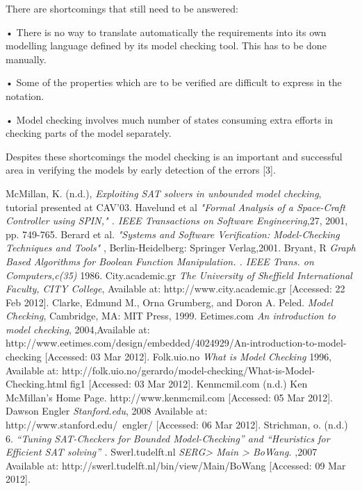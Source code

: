 \documentclass{article}
\begin{document}
There are shortcomings that still need to be answered:


•	There is no way to translate automatically the requirements into its own modelling language defined by its model checking tool. This has to be done manually.


•	Some of the properties which are to be verified are difficult to express in the notation.


•	Model checking involves much number of states consuming extra efforts in checking parts of the model separately. 


Despites these shortcomings the model checking is an important and successful area in verifying the models by early detection of the errors [3].

\begin{thebibliography}{}
 McMillan, K. (n.d.), \emph{Exploiting SAT solvers in unbounded model checking}, tutorial presented at CAV'03.
 Havelund et al \emph{"Formal Analysis of a Space-Craft Controller using SPIN," . IEEE Transactions on Software Engineering},27, 2001, pp. 749-765.
 Berard et al. \emph{"Systems and Software Verification: Model-Checking Techniques and Tools"} , Berlin-Heidelberg: Springer Verlag,2001.
 Bryant, R \emph{Graph Based Algorithms for Boolean Function Manipulation. . IEEE Trans. on Computers,c(35)} 1986.
 City.academic.gr \emph{The University of Sheffield International Faculty, CITY College}, Available at: http://www.city.academic.gr [Accessed: 22 Feb 2012].
\bibitem{ }
Clarke, Edmund M., Orna Grumberg, and Doron A. Peled. \emph{Model Checking}, Cambridge, MA: MIT Press, 1999.
 Eetimes.com \emph{An introduction to model checking}, 2004,Available at: http://www.eetimes.com/design/embedded/4024929/An-introduction-to-model-checking [Accessed: 03 Mar 2012].
 Folk.uio.no \emph{What is Model Checking} 1996, Available at: http://folk.uio.no/gerardo/model-checking/What-is-Model-Checking.html fig1 [Accessed: 03 Mar 2012].
 Kenmcmil.com (n.d.) Ken McMillan's Home Page. http://www.kenmcmil.com [Accessed: 05 Mar 2012].
 Dawson Engler \emph{Stanford.edu}, 2008 Available at: http://www.stanford.edu/~engler/ [Accessed: 06 Mar 2012].  
 Strichman, o. (n.d.) 6.  \emph{“Tuning SAT-Checkers for Bounded Model-Checking” and “Heuristics for Efficient SAT solving” .}
 Swerl.tudelft.nl \emph{SERG> Main > BoWang.} ,2007 Available at: http://swerl.tudelft.nl/bin/view/Main/BoWang [Accessed: 09 Mar 2012]. 




\end{thebibliography}
\end{document}
